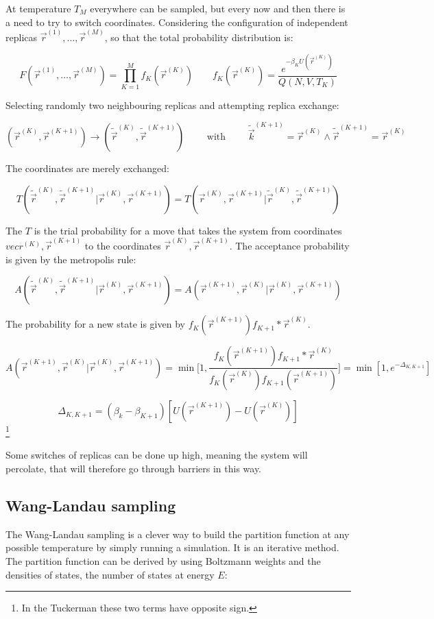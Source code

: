 	At temperature $T_M$ everywhere can be sampled, but every now and then there is a need to try to switch coordinates.
	Considering the configuration of independent replicas $\vec{r}^{(1)}, \dots, \vec{r}^{(M)}$, so that the total probability distribution is:

	$$F(\vec{r}^{(1)}, \dots, \vec{r}^{(M)}) = \prod\limits_{K=1}^Mf_K(\vec{r}^{(K)})\qquad f_K(\vec{r}^{(K)}) = \frac{e^{-\beta_K U(\vec{r}^{(K)})}}{Q(N ,V, T_K)}$$

	Selecting randomly two neighbouring replicas and attempting replica exchange:

	$$(\vec{r}^{(K)}, \vec{r}^{(K+1)})\rightarrow (\tilde{\vec{r}}^{(K)}, \tilde{\vec{r}}^{(K+1)})\qquad\text{ with }\qquad \tilde{\vec{k}}^{(K+1)} = \vec{r}^{(K)}\land \tilde{\vec{r}}^{(K+1)}=\vec{r}^{(K)}$$

	The coordinates are merely exchanged:

	$$T(\tilde{\vec{r}}^{(K)}, \tilde{\vec{r}}^{(K+1)}|\vec{r}^{(K)}, \vec{r}^{(K+1)}) = T(\vec{r}^{(K)}, \vec{r}^{(K+1)}|\tilde{\vec{r}}^{(K)}, \tilde{\vec{r}}^{(K+1)})$$

	The $T$ is the trial probability for a move that takes the system from coordinates $vec{r}^{(K)}, \vec{r}^{(K+1)}$ to the coordinates $\vec{r}^{(K)}, \vec{r}^{(K+1)}$.
	The acceptance probability is given by the metropolis rule:

	$$A(\tilde{\vec{r}}^{(K)}, \tilde{\vec{r}}^{(K+1)}|\vec{r}^{(K)}, \vec{r}^{(K+1)}) = A(\vec{r}^{(K+1)}, \vec{r}^{(K)} | \vec{r}^{(K)}, \vec{r}^{(K+1)})$$

	The probability for a new state is given by $f_K(\vec{r}^{(K+1)})f_{K+1}*\vec{r}^{(K)}$.

	$$A(\vec{r}^{(K+1)}, \vec{r}^{(K)} | \vec{r}^{(K)}, \vec{r}^{(K+1)}) = \min\biggl[1, \frac{f_K(\vec{r}^{(K+1)})f_{K+1}*\vec{r}^{(K)}}{f_K(\vec{r}^{(K)})f_{K+1}(\vec{r}^{(K+1)})}\biggr] = \min[1, e^{-\Delta_{K, K+1}}]$$

	$$\Delta_{K, K+1} = (\beta_k-\beta_{K+1})[U(\vec{r}^{(K+1)}) - U(\vec{r}^{(K)})]$$\footnote{In the Tuckerman these two terms have opposite sign.}

	Some switches of replicas can be done up high, meaning the system will percolate, that will therefore go through barriers in this way.

	\subsection{Wang-Landau sampling}
	The Wang-Landau sampling is a clever way to build the partition function at any possible temperature by simply running a simulation.
	It is an iterative method.
	The partition function can be derived by using Boltzmann weights and the densities of states, the number of states at energy $E$:

